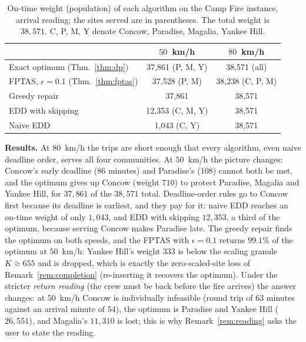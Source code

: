 \documentclass[pdflatex,sn-mathphys-ay]{sn-jnl}
\theoremstyle{thmstyleone}
\theoremstyle{thmstyletwo}
\theoremstyle{thmstylethree}
\begin{document}
\begin{table}[h]
\caption{On-time weight (population) of each algorithm on the Camp Fire
instance, arrival reading; the sites served are in parentheses. The total
weight is $38{,}571$. C, P, M, Y denote Concow, Paradise, Magalia, Yankee
Hill.}\label{tab:campfire-results}
\small
\begin{tabular}{@{}lcc@{}}
\toprule
 & $50$~km/h & $80$~km/h \\
\midrule
Exact optimum (Thm.~\ref{thm:dp}) & 37{,}861 (P, M, Y) & 38{,}571 (all) \\
FPTAS, $\epsilon=0.1$ (Thm.~\ref{thm:fptas}) & 37{,}528 (P, M) & 38{,}238 (C, P, M) \\
Greedy repair & 37{,}861 & 38{,}571 \\
EDD with skipping & 12{,}353 (C, M, Y) & 38{,}571 \\
Naive EDD & 1{,}043 (C, Y) & 38{,}571 \\
\bottomrule
\end{tabular}
\end{table}

\textbf{Results.} At $80$~km/h the trips are short enough that every
algorithm, even naive deadline order, serves all four communities. At
$50$~km/h the picture changes: Concow's early deadline (86 minutes) and
Paradise's (108) cannot both be met, and the optimum gives up Concow
(weight $710$) to protect Paradise, Magalia and Yankee Hill, for
$37{,}861$ of the $38{,}571$ total. Deadline-order rules go to Concow
first because its deadline is earliest, and they pay for it: naive EDD
reaches an on-time weight of only $1{,}043$, and EDD with skipping $12{,}353$, a third
of the optimum, because serving Concow makes Paradise late. The greedy
repair finds the optimum on both speeds, and the FPTAS with $\epsilon=0.1$
returns $99.1\%$ of the optimum at $50$~km/h: Yankee Hill's weight $333$
is below the scaling granule $K\approx655$ and is dropped, which is
exactly the zero-scaled-site loss of Remark~\ref{rem:completion}
(re-inserting it recovers the optimum). Under the stricter \emph{return
reading} (the crew must be back before the fire arrives) the answer
changes: at $50$~km/h Concow is individually infeasible (round trip of
$63$ minutes against an arrival minute of $54$), the optimum is Paradise
and Yankee Hill ($26{,}551$), and Magalia's $11{,}310$ is lost; this is
why Remark~\ref{rem:reading} asks the user to state the reading.
\end{document}
